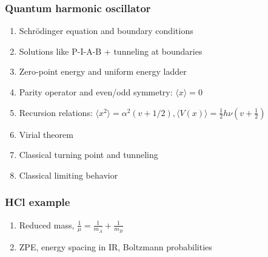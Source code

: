 \documentclass[11pt]{article}
\begin{document}
\subsubsection{Quantum harmonic oscillator}
\label{sec:orgb17baeb}
\begin{enumerate}
\item Schr\"{o}dinger equation and boundary conditions
\item Solutions like P-I-A-B + tunneling at boundaries
\item Zero-point energy and uniform energy ladder
\item Parity operator and even/odd symmetry:  \(\langle x \rangle =0\)
\item Recursion relations: \(\langle x^2 \rangle =
      \alpha^2 (v+1/2), \langle V(x) \rangle = \frac{1}{2} h\nu (v+\frac{1}{2})\)
\item Virial theorem
\item Classical turning point and tunneling
\item Classical limiting behavior
\end{enumerate}
\subsubsection{HCl example}
\label{sec:orgabafaaf}
\begin{enumerate}
\item Reduced mass, \(\frac{1}{\mu}=\frac{1}{m_A}+\frac{1}{m_B}\)
\item ZPE, energy spacing in IR, Boltzmann probabilities
\end{enumerate}
\end{document}
